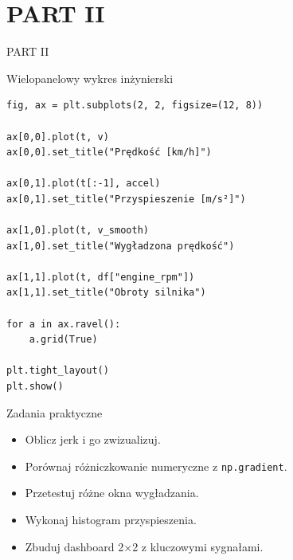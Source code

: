 \documentclass[aspectratio=169]{beamer}
\begin{document}
\section{PART II}
\begin{frame}[plain]
  \begin{center}
    \vspace{2cm}
    {\color{white}\Huge PART II}
  \end{center}
\end{frame}

\begin{frame}[fragile]{Wielopanelowy wykres inżynierski}
\begin{verbatim}
fig, ax = plt.subplots(2, 2, figsize=(12, 8))

ax[0,0].plot(t, v)
ax[0,0].set_title("Prędkość [km/h]")

ax[0,1].plot(t[:-1], accel)
ax[0,1].set_title("Przyspieszenie [m/s²]")

ax[1,0].plot(t, v_smooth)
ax[1,0].set_title("Wygładzona prędkość")

ax[1,1].plot(t, df["engine_rpm"])
ax[1,1].set_title("Obroty silnika")

for a in ax.ravel():
    a.grid(True)

plt.tight_layout()
plt.show()
\end{verbatim}
\end{frame}

\begin{frame}{Zadania praktyczne}
  \begin{itemize}
    \item Oblicz jerk i go zwizualizuj.
    \item Porównaj różniczkowanie numeryczne z \texttt{np.gradient}.
    \item Przetestuj różne okna wygładzania.
    \item Wykonaj histogram przyspieszenia.
    \item Zbuduj dashboard 2×2 z kluczowymi sygnałami.
  \end{itemize}
\end{frame}

\end{document}
